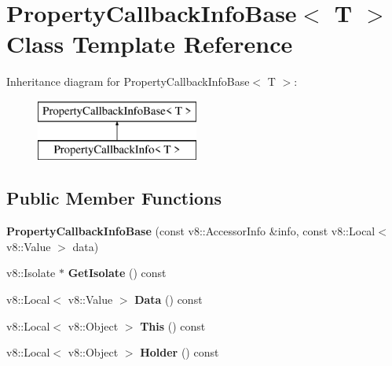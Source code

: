 \hypertarget{class_property_callback_info_base}{}\section{Property\+Callback\+Info\+Base$<$ T $>$ Class Template Reference}
\label{class_property_callback_info_base}
Inheritance diagram for Property\+Callback\+Info\+Base$<$ T $>$\+:\begin{figure}[H]
\begin{center}
\leavevmode
\includegraphics[height=2.000000cm]{class_property_callback_info_base}
\end{center}
\end{figure}
\subsection*{Public Member Functions}
\begin{DoxyCompactItemize}
\item 
\mbox{\label{class_property_callback_info_base_a2fc697fc0cbfdec2074772e84f9346e6}} 
{\bfseries Property\+Callback\+Info\+Base} (const v8\+::\+Accessor\+Info \&info, const v8\+::\+Local$<$ v8\+::\+Value $>$ data)
\item 
\mbox{\label{class_property_callback_info_base_adddac2bf69787a6ff6ab3cd8ca296338}} 
v8\+::\+Isolate $\ast$ {\bfseries Get\+Isolate} () const
\item 
\mbox{\label{class_property_callback_info_base_a928b4986af3f0861800add01297a48b0}} 
v8\+::\+Local$<$ v8\+::\+Value $>$ {\bfseries Data} () const
\item 
\mbox{\label{class_property_callback_info_base_a49c54068aa2e8cbcfbb3d4fc35ce3b46}} 
v8\+::\+Local$<$ v8\+::\+Object $>$ {\bfseries This} () const
\item 
\mbox{\label{class_property_callback_info_base_a576cf53e0dba6d749b74dabf00b89564}} 
v8\+::\+Local$<$ v8\+::\+Object $>$ {\bfseries Holder} () const
\end{DoxyCompactItemize}
